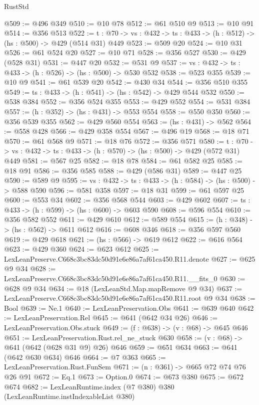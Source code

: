 \begin{lexlean}{RustStd}
\begin{coremodule}
@509 := @496 @349
@510 := @10 @78
@512 := @61 @510 @9
@513 := @10 @91
@514 := @356 @513
@522 := {t : @70} -> {vs : @432} -> {ts : @433} -> (h : @512) -> (hs : @500) -> @429 (@514 @31) @449
@523 := @509 @20
@524 := @10 @31
@526 := @61 @524 @20
@527 := @10 @71
@528 := @356 @527
@530 := @429 (@528 @31)
@531 := @447 @20
@532 := @531 @9
@537 := {vs : @432} -> {ts : @433} -> (h : @526) -> (hs : @500) -> @530 @532
@538 := @523 @355
@539 := @10 @9
@541 := @61 @539 @20
@542 := @430 @34
@544 := @356 @510 @355
@549 := {ts : @433} -> (h : @541) -> (hs : @542) -> @429 @544 @532
@550 := @538 @384
@552 := @356 @524 @355
@553 := @429 @552
@554 := @531 @384
@557 := (h : @352) -> (hs : @431) -> @553 @554
@558 := @550 @350
@560 := @356 @539 @355
@562 := @429 @560 @554
@563 := (hs : @431) -> @562
@564 := @558 @428
@566 := @429 @358 @554
@567 := @496 @19
@568 := @18 @71
@570 := @61 @568 @9
@571 := @18 @76
@572 := @356 @571
@580 := {t : @70} -> {vs : @432} -> {ts : @433} -> (h : @570) -> (hs : @500) -> @429 (@572 @31) @449
@581 := @567 @25
@582 := @18 @78
@584 := @61 @582 @25
@585 := @18 @91
@586 := @356 @585
@588 := @429 (@586 @31)
@589 := @447 @25
@590 := @589 @9
@595 := {vs : @432} -> {ts : @433} -> (h : @584) -> (hs : @500) -> @588 @590
@596 := @581 @358
@597 := @18 @31
@599 := @61 @597 @25
@600 := @553 @34
@602 := @356 @568 @544
@603 := @429 @602
@607 := {ts : @433} -> (h : @599) -> (hs : @600) -> @603 @590
@608 := @596 @554
@610 := @356 @582 @552
@611 := @429 @610
@612 := @589 @554
@615 := (h : @348) -> (hs : @562) -> @611 @612
@616 := @608 @346
@618 := @356 @597 @560
@619 := @429 @618
@621 := (hs : @566) -> @619 @612
@622 := @616 @564
@623 := @429 @360
@624 := @623 @612
@625 := LexLeanPreserve.C668c3bc83dc50d91e6e86a7af61ca450.R11.denote
@627 := @625 @9 @34
@628 := LexLeanPreserve.C668c3bc83dc50d91e6e86a7af61ca450.R11.__fits_0
@630 := @628 @9 @34
@634 := @18 (LexLeanStd.Map.mapRemove @9 @34)
@637 := LexLeanPreserve.C668c3bc83dc50d91e6e86a7af61ca450.R11.root @9 @34
@638 := Bool
@639 := Ne.{1}
@640 := LexLeanPreservation.Obs
@641 := @639 @640
@642 := LexLeanPreservation.Rel
@645 := @641 (@642 @34 @26)
@646 := LexLeanPreservation.Obs.stuck
@649 := (f : @638) -> (v : @68) -> @645 @646
@651 := LexLeanPreservation.Rust.rel_ne_stuck @630
@658 := (v : @68) -> @641 (@642 (@628 @31 @9) @26) @646
@659 := @651 @634
@663 := @641 (@642 @630 @634) @646
@664 := @7 @363
@665 := LexLeanPreservation.Rust.FunSem
@671 := (n : @361) -> @665 @72 @74 @76 @26 @91
@672 := Eq.{1}
@673 := Option.{0}
@674 := @673 @380
@675 := @672 @674
@682 := LexLeanRuntime.index (@7 @380) @380 (LexLeanRuntime.instIndexableList @380)

\end{coremodule}
\end{lexlean}
